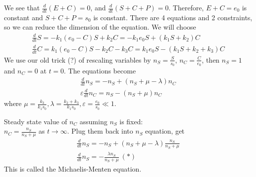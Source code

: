 \documentclass[a4paper]{article}
\begin{document}
We see that $\frac{d}{dt} (E+C)=0$, and $\frac{d}{dt} (S+C+P)=0$. Therefore, $E+C=e_0$ is constant and $S+C+P=s_0$ is constant. There are 4 equations and 2 constraints, so we can reduce the dimension of the equation. We will choose
\begin{equation*}
\begin{aligned}
\frac{d}{dt} S = -k_1(e_0-C) S + k_2 C = -k_1e_0 S + (k_1S+k_2) C\\
\frac{d}{dt} C = k_1(e_0-C)S - k_2C - k_3C = k_1 e_0 S - (k_1S+k_2+k_3) C
\end{aligned}
\end{equation*}
We use our old trick (?) of rescaling variables by $n_S = \frac{S}{s_0}$, $n_C = \frac{C}{e_0}$, then $n_S=1$ and $n_C=0$ at $t=0$. The equations become 
\begin{equation*}
\begin{aligned}
\frac{d}{dt} n_S = -n_S + (n_S + \mu-\lambda) n_C\\
\varepsilon \frac{d}{dt} n_C = n_S - (n_S+\mu) n_C
\end{aligned}
\end{equation*}
where $\mu = \frac{k_3}{k_1s_0}, \lambda = \frac{k_2+k_3}{k_1s_0}, \varepsilon = \frac{e_0}{s_0} \ll 1$.

Steady state value of $n_C$ assuming $n_S$ is fixed:\\
$n_C = \frac{n_S}{n_S+\mu}$ as $t \to \infty$. Plug them back into $n_S$ equation, get
\begin{equation*}
\begin{aligned}
\frac{d}{dt} n_S = -n_S + (n_S+\mu-\lambda) \frac{n_S}{n_S+\mu}\\
\frac{d}{dt} n_S = -\frac{\lambda n_S}{n_S + \mu} \ (*)
\end{aligned}
\end{equation*}
This is called the Michaelis-Menten equation.
\end{document}
